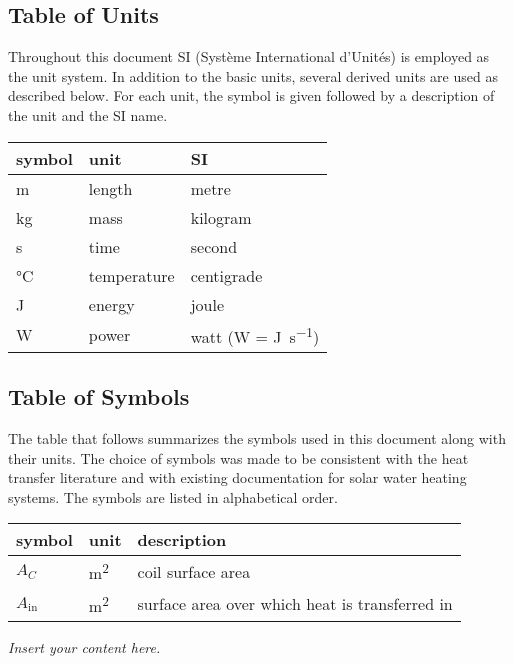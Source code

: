 \documentclass[12pt]{article}
\newcommand{\lips}{\textit{Insert your content here.}}
\begin{document}
\subsection{Table of Units}

Throughout this document SI (Syst\`{e}me International d'Unit\'{e}s) is employed
as the unit system.  In addition to the basic units, several derived units are
used as described below.  For each unit, the symbol is given followed by a
description of the unit and the SI name.
~\newline

\renewcommand{\arraystretch}{1.2}
  \noindent \begin{tabular}{l l l} 
    \toprule		
    \textbf{symbol} & \textbf{unit} & \textbf{SI}\\
    \midrule 
    \si{\metre} & length & metre\\
    \si{\kilogram} & mass	& kilogram\\
    \si{\second} & time & second\\
    \si{\celsius} & temperature & centigrade\\
    \si{\joule} & energy & joule\\
    \si{\watt} & power & watt (W = \si{\joule\per\second})\\
    \bottomrule
  \end{tabular}

\subsection{Table of Symbols}

The table that follows summarizes the symbols used in this document along with
their units.  The choice of symbols was made to be consistent with the heat
transfer literature and with existing documentation for solar water heating
systems.  The symbols are listed in alphabetical order.

\renewcommand{\arraystretch}{1.2}
\noindent \begin{longtable*}{l l p{12cm}} \toprule
\textbf{symbol} & \textbf{unit} & \textbf{description}\\
\midrule 
$A_C$ & \si[per-mode=symbol] {\square\metre} & coil surface area
\\
$A_\text{in}$ & \si[per-mode=symbol] {\square\metre} & surface area over 
which heat is transferred in
\\ 
\bottomrule
\end{longtable*}
\lips
\end{document}
